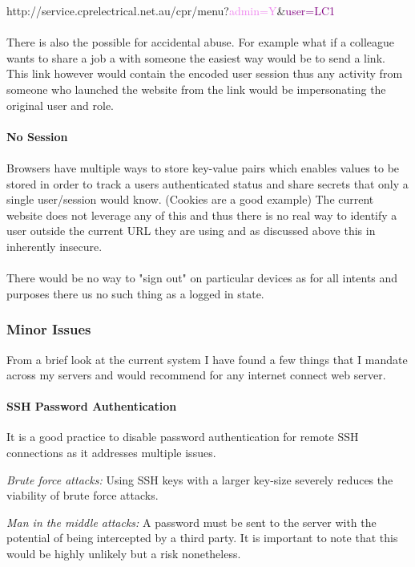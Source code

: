 \begin{mdframed}
    http://service.cprelectrical.net.au/cpr/menu?\textcolor{violet}{admin=Y}\&\textcolor{purple}{user=LC1}
\end{mdframed}

\paragraph{}
There is also the possible for accidental abuse.
For example what if a colleague wants to share a job a with someone the easiest way would be to send a link.
This link however would contain the encoded user session thus any activity from someone who launched the website from
the link would be impersonating the original user and role.

\paragraph{No Session}
\paragraph{}
Browsers have multiple ways to store key-value pairs which enables values to be stored in order to track a users authenticated status and share
secrets that only a single user/session would know. (Cookies are a good example)
The current website does not leverage any of this and thus there is no real way to identify a user outside the current URL they are using and as discussed
above this in inherently insecure.

\paragraph{}
There would be no way to "sign out" on particular devices as for all intents and purposes there us no such thing as a logged in state.


\subsubsection{Minor Issues}\label{subsubsec:minor-issues}
From a brief look at the current system I have found a few things that I mandate across my servers and would recommend for any internet
connect web server.

\paragraph{SSH Password Authentication}
It is a good practice to disable password authentication for remote SSH connections as it addresses multiple issues.
\begin{description}
    \item \emph{Brute force attacks:} Using SSH keys with a larger key-size severely reduces the viability of brute force attacks.
    \item \emph{Man in the middle attacks:} A password must be sent to the server with the potential of being intercepted by a third party.
    It is important to note that this would be highly unlikely but a risk nonetheless.
\end{description}

